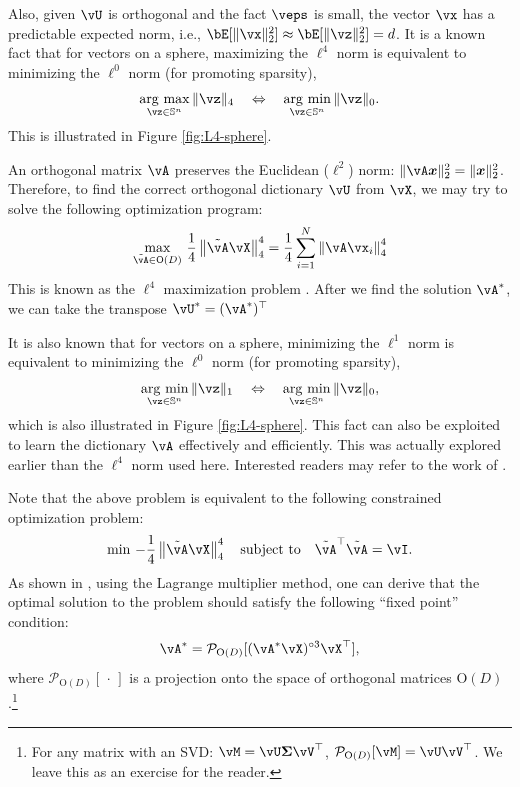 \documentclass[../../book-main.tex]{subfiles}
\begin{document}
Also, given $\vU$ is orthogonal and the fact $\veps$ is small, the vector $\vx$ has a predictable expected norm, i.e., $\bE[\norm{\vx}_2^2] \approx \bE[\norm{\vz}_2^2]=d$. It is a known fact that for vectors on a sphere, maximizing the $\ell^4$ norm is equivalent to minimizing the $\ell^0$ norm (for promoting sparsity),
\begin{equation}
    \argmax_{\vz \in \mathbb{S}^n}\|\vz\|_{4}\quad\Leftrightarrow\quad \argmin_{\vz \in \mathbb{S}^n}\|\vz\|_{0}.
\end{equation}
This is illustrated in Figure \ref{fig:L4-sphere}.

An orthogonal matrix $\vA$ preserves the Euclidean (\(\ell^{2}\)) norm: $\|\vA \x\|_2^2 = \|\x\|_2^2$. Therefore, to find the correct orthogonal dictionary $\vU$ from $\vX$, we may try to solve the following optimization program:
\begin{equation}\label{eq0:orthogonal-dictionary-learning-l4}
    \max_{\tilde{\vA} \in \O(D)}\,
     \frac{1}{4} \norm*{
    \tilde{\vA} \vX
    }_4^4 =  \frac{1}{4} \sum_{i=1}^N \norm*{
    \vA \vx_i
    }_4^4
\end{equation}
This is known as the $\ell^4$ maximization problem \cite{Zhai-2020}. After we find the solution \(\vA^{\ast}\), we can take the transpose \(\vU^{\ast} = (\vA^{\ast})^{\top}\)
\begin{remark}
    It is also known that for vectors on a sphere, minimizing the $\ell^1$ norm is equivalent to minimizing the $\ell^0$ norm (for promoting sparsity),
\begin{equation*}
            \argmin_{\vz \in \mathbb{S}^n}\|\vz\|_{1}\quad\Leftrightarrow\quad \argmin_{\vz \in \mathbb{S}^n}\|\vz\|_{0},
\end{equation*}
which is also illustrated in Figure \ref{fig:L4-sphere}. This fact can also be exploited to learn the dictionary $\vA$ effectively and efficiently. This was actually explored earlier than the $\ell^4$ norm used here. Interested readers may refer to the work of \cite{qu2020findingsparsestvectorssubspace}.
\end{remark}

Note that the above problem is equivalent to the following constrained optimization problem:
\begin{equation}\label{eq:orthogonal-dictionary-learning-l4}
    \min\,
    -   \frac{1}{4} \norm*{
    \tilde{\vA} \vX
    }_4^4 \quad \mbox{subject to} \quad  \tilde{\vA}^\top\tilde{\vA} = \vI.
\end{equation}
As shown in \cite{Wright-Ma-2022}, using the Lagrange multiplier method, one can derive that the optimal solution to the problem should satisfy the following 
``fixed point'' condition:
\begin{equation}
    \vA^{\ast} = \mathcal{P}_{\mathrm O(D)}[( {\vA^{\ast} \vX})^{\circ3}\vX^\top],
\end{equation}
where $\mathcal{P}_{\mathrm O(D)}[\,\cdot\,]$ is a projection onto the space of orthogonal matrices $\mathrm O(D)$.\footnote{For any matrix with an SVD: $\vM = \vU\bm \Sigma \vV^\top$, $\mathcal{P}_{\mathrm O(D)}[\vM] = \vU \vV^\top$. We leave this as an exercise for the reader.} 
\end{document}
